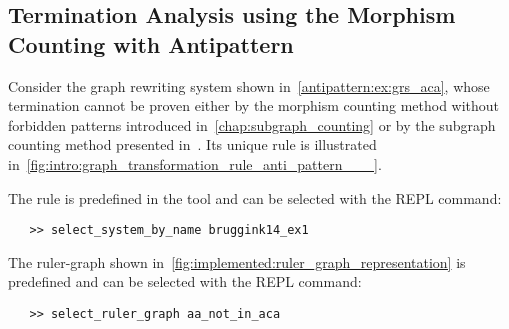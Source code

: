\subsection{Termination Analysis using the Morphism Counting with Antipattern}
Consider the graph rewriting system shown in~\autoref{antipattern:ex:grs_aca}, whose termination cannot be proven either by the morphism counting method without forbidden patterns introduced in~\ref{chap:subgraph_counting} or by the subgraph counting method presented in~\cite{overbeek2024termination_lmcs}. Its unique rule is illustrated in~\autoref{fig:intro:graph_transformation_rule_anti_pattern___}.
 \begin{figure}[H]
    \centering
{}
  \caption{}
  \label{fig:intro:graph_transformation_rule_anti_pattern___}
 \end{figure}
The rule is predefined in the tool and can be selected with the REPL command:
 \begin{verbatim}
   >> select_system_by_name bruggink14_ex1
 \end{verbatim}
The ruler-graph shown in~\autoref{fig:implemented:ruler_graph_representation} is predefined and can be selected with the REPL command:
 \begin{verbatim}
   >> select_ruler_graph aa_not_in_aca
 \end{verbatim}

